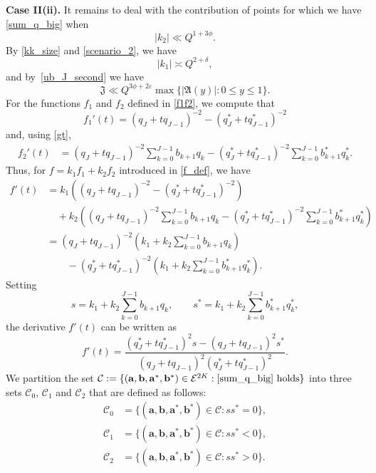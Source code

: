 \documentclass[12pt, reqno]{amsart}
\theoremstyle{definition}
\theoremstyle{remark}
\numberwithin{equation}{section}
\def\del{{\delta}} \def\Del{{\Delta}}
\def\le{\leqslant} \def\ge{\geqslant}
\def \ba {\mathbf a}
\def \bb {\mathbf b}
\def \fA {\mathfrak A}
\def \fJ {\mathfrak J}
\def \cC {\mathcal C}
\def \cE {\mathcal E}
\begin{document}
\bigskip

\textbf{Case II(ii).} It remains to deal with the contribution of points for which we have \eqref{sum_q_big} when
\begin{equation} \label{scenario_2}
|k_2| \ll 
Q^{1 + 3 \phi}.
\end{equation}
By \eqref{kk_size} and \eqref{scenario_2}, we have 
\begin{equation}
\label{k1large}
|k_1| \asymp Q^{2 + \del},
\end{equation}
and by~\eqref{ub_J_second} we have
\[
\fJ \ll Q^{3 \phi+2\varepsilon} 
\max \{ |\fA(y)|: 0 \le y \le 1 \}.
\]
For the functions $f_1$ and $f_2$ defined in \eqref{f1f2}, we compute that
\[
f_1'(t) = (q_J+tq_{J-1})^{-2} - (q_J^*+tq^*_{J-1})^{-2}
\]
and, using \eqref{gt},
\begin{align*}
f_2'(t) &=
(q_J+tq_{J-1})^{-2}\sum_{k=0}^{J-1}b_{k+1}q_k
- (q_J^*+tq^*_{J-1})^{-2}\sum_{k=0}^{J-1}b^*_{k+1}q_k^*.
\end{align*}
Thus, for $f=k_1f_1 + k_2f_2$ introduced in \eqref{f_def}, we have
\begin{align*}
f'(t) &=
k_1(
(q_J+tq_{J-1})^{-2} - (q_J^*+tq^*_{J-1})^{-2}) \\
& \quad +
k_2\left( (q_J+tq_{J-1})^{-2}\sum_{k=0}^{J-1}b_{k+1}q_k
- (q_J^*+tq^*_{J-1})^{-2}\sum_{k=0}^{J-1}b^*_{k+1}q_k^* \right)
\\
&=
(q_J+tq_{J-1})^{-2}
\left(k_1+k_2\sum_{k=0}^{J-1}b_{k+1}q_k\right) \\
& \qquad - (q_J^*+tq^*_{J-1})^{-2}
\left(k_1+k_2\sum_{k=0}^{J-1}b_{k+1}^*q_k^*\right).
\end{align*}
Setting
\begin{equation} \label{ss_def}
s = k_1 + k_2 \sum_{k=0}^{J-1} b_{k+1} q_k,
\qquad s^* = k_1 + k_2 \sum_{k=0}^{J-1} b_{k+1}^* q_k^*,
\end{equation}
the derivative $f'(t)$ can be written as
\begin{equation} \label{fprime1}
f'(t) =
\frac{(q_J^* + tq_{J-1}^*)^2 s - (q_J + tq_{J-1})^2 s^*}{(q_J + tq_{J-1})^2 (q_J^* + tq_{J-1}^*)^2}.
\end{equation}
We partition the set 
$\cC :=
\{ (\ba,\bb,\ba^*,\bb^*)\in\cE^{2K}: \eqref{sum_q_big} \text{ holds} \}$ into three sets $\cC_0$, $\cC_1$ and $\cC_2$ that are defined as follows: 
\begin{align*}
\cC_0 &= \{ (\ba,\bb,\ba^*,\bb^*)\in \cC : ss^* =0 \}, \\
\cC_1 &= \{  (\ba,\bb,\ba^*,\bb^*)\in \cC : ss^* <0  \},   \\
\cC_2 &= \{  (\ba,\bb,\ba^*,\bb^*)\in \cC : ss^* >0  \}.
\end{align*}
\end{document}
